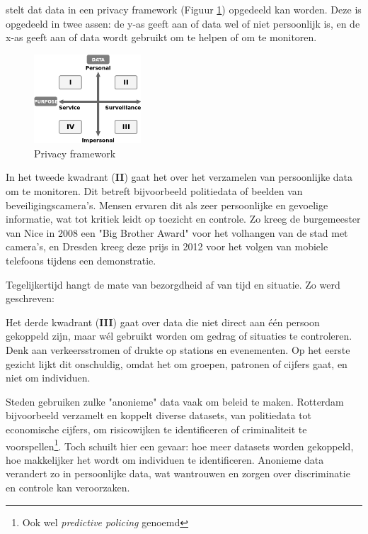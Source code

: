 \documentclass[nonacm, sigconf]{acmart}
\begin{document}
    \parencite{van2016privacy} stelt dat data in een privacy framework (Figuur \ref{fig:privacy_framework}) opgedeeld kan worden.
    Deze is opgedeeld in twee assen: de y-as geeft aan of data wel of niet persoonlijk is, en de x-as geeft aan of data wordt gebruikt om te helpen of om te monitoren.

    \begin{figure}[h]
        \centering
        \includegraphics[width=40mm]{images/SmartCityPrivacy}
        \caption{Privacy framework {\parencite[nagemaakt van][]{van2016privacy}}}
        \label{fig:privacy_framework}
    \end{figure}

    In het tweede kwadrant (\textbf{II}) gaat het over het verzamelen van persoonlijke data om te monitoren.
    Dit betreft bijvoorbeeld politiedata of beelden van beveiligingscamera's.
    Mensen ervaren dit als zeer persoonlijke en gevoelige informatie, wat tot kritiek leidt op toezicht en controle.
    Zo kreeg de burgemeester van Nice in 2008 een "Big Brother Award" voor het volhangen van de stad met camera's, en Dresden kreeg deze prijs in 2012 voor het volgen van mobiele telefoons tijdens een demonstratie.

    Tegelijkertijd hangt de mate van bezorgdheid af van tijd en situatie.
    Zo werd geschreven:

    Het derde kwadrant (\textbf{III}) gaat over data die niet direct aan één persoon gekoppeld zijn, maar wél gebruikt worden om gedrag of situaties te controleren.
    Denk aan verkeersstromen of drukte op stations en evenementen.
    Op het eerste gezicht lijkt dit onschuldig, omdat het om groepen, patronen of cijfers gaat, en niet om individuen.

    Steden gebruiken zulke "anonieme" data vaak om beleid te maken.
    Rotterdam bijvoorbeeld verzamelt en koppelt diverse datasets, van politiedata tot economische cijfers, om risicowijken te identificeren of criminaliteit te voorspellen\footnote{Ook wel \textit{predictive policing} genoemd}.
    Toch schuilt hier een gevaar: hoe meer datasets worden gekoppeld, hoe makkelijker het wordt om individuen te identificeren.
    Anonieme data verandert zo in persoonlijke data, wat wantrouwen en zorgen over discriminatie en controle kan veroorzaken.
\end{document}
